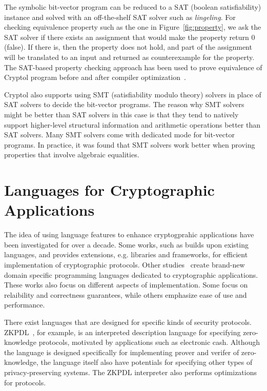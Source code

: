 \documentclass[a4paper, notitlepage]{report}
\begin{document}
The symbolic bit-vector program can be reduced to a SAT (boolean satisfiability)
instance and solved with an
off-the-shelf SAT solver such as \emph{lingeling}. For checking equivalence property
such as the one in Figure~\ref{fig:property}, we ask the SAT solver if there exists
an assignment that would make the property return 0 (false). If there is, then the
property does not hold, and part of the assignment will be translated to an input
and returned as counterexample for the property. The SAT-based property checking
approach has been used to prove equivalence of Cryptol program before and after
compiler optimization~\cite{erkok2009pragmatic}.

Cryptol also supports using SMT (satisfiability modulo theory)
solvers in place of SAT solvers to decide the
bit-vector programs. The reason why SMT solvers might be better than SAT solvers
in this case is that they tend to natively support higher-level structural information
and arithmetic operations better than SAT solvers. Many SMT solvers come with dedicated
mode for bit-vector programs. In practice, it was found that SMT solvers work better
when proving properties that involve algebraic equalities.



\section{Languages for Cryptographic Applications}
\label{sec:crypto_lang}

The idea of using language features to enhance cryptogprahic applications 
have been investigated for over a decade. Some works, such 
as \cite{akinyele2013charm} builds upon existing languages, and provides
extensions, e.g. libraries and frameworks, for efficient implementation 
of cryptographic protocols. 
Other studies~\cite{lewis2003cryptol} create brand-new domain specific 
programming languages dedicated to cryptographic applications. These
works also focus on different aspects of implementation. Some focus
on relaibility and correctness guarantees, while others emphasize ease 
of use and performance.

There exist languages that are designed for specific kinds of security protocols.
ZKPDL~\cite{meiklejohn2010zkpdl}, for example, is an interpreted description language 
for specifying zero-knowledge protocols, motivated by applications such
as electronic cash. Although the language is designed specifically for
implementing prover and verifer of zero-knowledge, the language itself 
also have potentials for specifying other types of privacy-preserving 
systems. The ZKPDL interpreter also performs optimizations for protocols.
\end{document}
